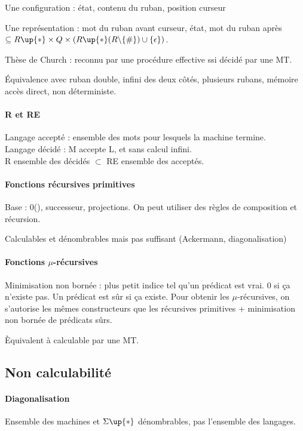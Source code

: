 \documentclass[french]{article}
\begin{document}
Une configuration : état, contenu du ruban, position curseur

Une représentation : mot du ruban avant curseur, état, mot du ruban après $\subseteq R\up{*}\times Q\times(R\up{*}(R\backslash\{\#\})\cup\{\epsilon\})$.

Thèse de Church : reconnu par une procédure effective ssi décidé par une MT.

Équivalence avec ruban double, infini des deux côtés, plusieurs rubans, mémoire accès direct,  non déterministe.

\paragraph{R et RE} 
Langage accepté : ensemble des mots pour lesquels la machine termine.\\
Langage décidé : M accepte L, et sans calcul infini.\\
R ensemble des décidés $\subset$ RE ensemble des acceptés.


\paragraph{Fonctions récursives primitives}
Base : 0(), successeur, projections. On peut utiliser des règles de composition et récursion.

Calculables et dénombrables mais pas suffisant (Ackermann, diagonalisation)

\paragraph{Fonctions $\mu$-récursives}
Minimisation non bornée : plus petit indice tel qu'un prédicat est vrai. 0 si ça n'existe pas. Un prédicat est sûr si ça existe. Pour obtenir les $\mu$-récursives, on s'autorise les mêmes constructeurs que les récursives primitives + minimisation non bornée de prédicats sûrs.

Èquivalent à calculable par une MT.

\subsection{Non calculabilité}
\paragraph{Diagonalisation} Ensemble des machines et $\Sigma\up{*}$ dénombrables, pas l'ensemble des langages.
\end{document}
